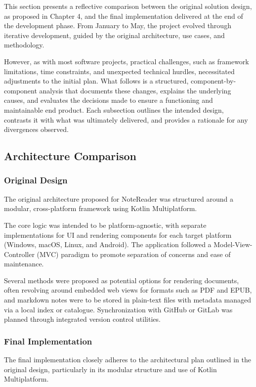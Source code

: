 This section presents a reflective comparison between the original solution design, as proposed in Chapter 4, and the final implementation delivered at the end of the development phase. From January to May, the project evolved through iterative development, guided by the original architecture, use cases, and methodology. 

However, as with most software projects, practical challenges, such as framework limitations, time constraints, and unexpected technical hurdles, necessitated adjustments to the initial plan. What follows is a structured, component-by-component analysis that documents these changes, explains the underlying causes, and evaluates the decisions made to ensure a functioning and maintainable end product. Each subsection outlines the intended design, contrasts it with what was ultimately delivered, and provides a rationale for any divergences observed.

\subsection{Architecture Comparison}
\subsubsection{Original Design}
The original architecture proposed for NoteReader was structured around a modular, cross-platform framework using Kotlin Multiplatform. 

The core logic was intended to be platform-agnostic, with separate implementations for UI and rendering components for each target platform (Windows, macOS, Linux, and Android). The application followed a Model-View-Controller (MVC) paradigm to promote separation of concerns and ease of maintenance. 

Several methods were proposed as potential options for rendering documents, often revolving around embedded web views for formats such as PDF and EPUB, and markdown notes were to be stored in plain-text files with metadata managed via a local index or catalogue. Synchronization with GitHub or GitLab was planned through integrated version control utilities.

\subsubsection{Final Implementation}
The final implementation closely adheres to the architectural plan outlined in the original design, particularly in its modular structure and use of Kotlin Multiplatform. 

